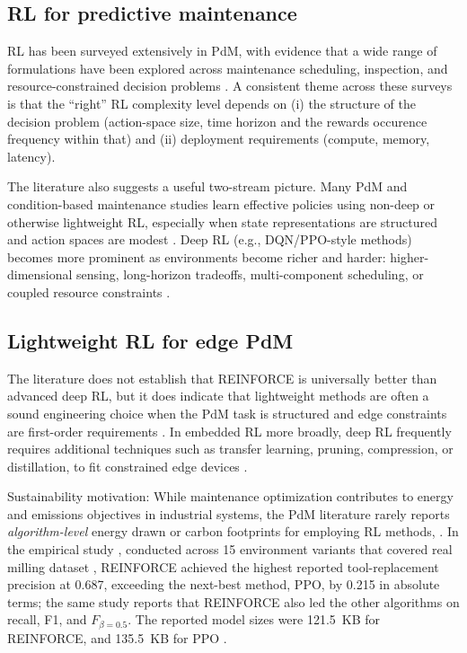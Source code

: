 \documentclass[sn-basic]{sn-jnl} %
\begin{document}
\subsection{RL for predictive maintenance}
RL has been surveyed extensively in PdM, with evidence that a wide range of formulations have been explored across maintenance scheduling, inspection, and resource-constrained decision problems \cite{Siraskar2023, Ogunfowora2023, Zhang2024}. A consistent theme across these surveys is that the ``right'' RL complexity level depends on (i) the structure of the decision problem (action-space size, time horizon and the rewards occurence frequency within that) and (ii) deployment requirements (compute, memory, latency).

The literature also suggests a useful two-stream picture. Many PdM and condition-based maintenance studies learn effective policies using non-deep or otherwise lightweight RL, especially when state representations are structured and action spaces are modest \cite{Adsule2020, Yousefi2020, Rasay2024, Dadash2024}. Deep RL (e.g., DQN/PPO-style methods) becomes more prominent as environments become richer and harder: higher-dimensional sensing, long-horizon tradeoffs, multi-component scheduling, or coupled resource constraints \cite{Liu2020, Chen2023, Lee2022, Ong2022-02}.

\subsection{Lightweight RL for edge PdM}
The literature does not establish that REINFORCE is universally better than advanced deep RL, but it does indicate that lightweight methods are often a sound engineering choice when the PdM task is structured and edge constraints are first-order requirements \cite{Compare2020, Njor2024, Pandey2023}. In embedded RL more broadly, deep RL frequently requires additional techniques such as transfer learning, pruning, compression, or distillation, to fit constrained edge devices \cite{Jang2020, Szydlo2022, Xu2022}.

Sustainability motivation: While maintenance optimization contributes to energy and emissions objectives in industrial systems, the PdM literature rarely reports \emph{algorithm-level} energy drawn or carbon footprints for employing RL methods, \cite{Banyai2021, Banyai2022, JasiulewiczKaczmarek2024}. In the empirical study \cite{Siraskar2025}, conducted across 15 environment variants that covered real milling dataset \cite{PHMdata2010}, REINFORCE achieved the highest reported tool-replacement precision at 0.687, exceeding the next-best method, PPO, by 0.215 in absolute terms; the same study reports that REINFORCE also led the other algorithms on recall, F1, and $F_{\beta=0.5}$. The reported model sizes were 121.5~KB for REINFORCE, and 135.5~KB for PPO \cite{Siraskar2025}.
\end{document}
